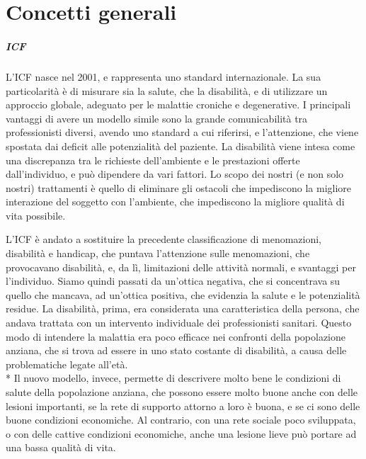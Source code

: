\chapter{Concetti generali}
\paragraph{ICF}
L'ICF nasce nel 2001, e rappresenta uno standard internazionale. La sua
particolarità è di misurare sia la salute, che la disabilità, e di utilizzare un
approccio globale, adeguato per le malattie croniche e degenerative. I
principali vantaggi di avere un modello simile sono la grande comunicabilità tra
professionisti diversi, avendo uno standard a cui riferirsi, e l'attenzione, che
viene spostata dai deficit alle potenzialità del paziente. La disabilità viene
intesa come una discrepanza tra le richieste dell'ambiente e le prestazioni
offerte dall'individuo, e può dipendere da vari fattori. Lo scopo dei nostri
(e non solo nostri) trattamenti è quello di eliminare gli ostacoli che
impediscono la migliore interazione del soggetto con l'ambiente, che impediscono
la migliore qualità di vita possibile.

L'ICF è andato a sostituire la precedente classificazione di menomazioni,
disabilità e handicap, che puntava l'attenzione sulle menomazioni, che
provocavano disabilità, e, da lì, limitazioni delle attività normali, e
svantaggi per l'individuo. Siamo quindi passati da un'ottica negativa, che si
concentrava su quello che mancava, ad un'ottica positiva, che evidenzia la
salute e le potenzialità residue.
La disabilità, prima, era considerata una caratteristica della persona, che
andava trattata con un intervento individuale dei professionisti sanitari.
Questo modo di intendere la malattia era poco efficace nei confronti della
popolazione anziana, che si trova ad essere in uno stato costante di disabilità,
a causa delle problematiche legate all'età.
\\* Il nuovo modello, invece, permette di descrivere molto bene le condizioni
di salute della popolazione anziana, che possono essere molto buone anche con
delle lesioni importanti, se la rete di supporto attorno a loro è buona, e se
ci sono delle buone condizioni economiche. Al contrario, con una rete sociale
poco sviluppata, o con delle cattive condizioni economiche, anche una lesione
lieve può portare ad una bassa qualità di vita.

